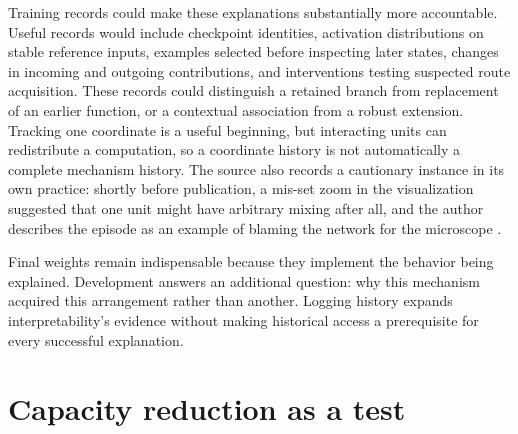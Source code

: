 \documentclass[11pt]{article}
\begin{document}
Training records could make these explanations substantially more accountable. Useful records would include checkpoint identities, activation distributions on stable reference inputs, examples selected before inspecting later states, changes in incoming and outgoing contributions, and interventions testing suspected route acquisition. These records could distinguish a retained branch from replacement of an earlier function, or a contextual association from a robust extension. Tracking one coordinate is a useful beginning, but interacting units can redistribute a computation, so a coordinate history is not automatically a complete mechanism history. The source also records a cautionary instance in its own practice: shortly before publication, a mis-set zoom in the visualization suggested that one unit might have arbitrary mixing after all, and the author describes the episode as an example of blaming the network for the microscope \cite[\emph{Watching Neurons Develop}]{cammarata}.

Final weights remain indispensable because they implement the behavior being explained. Development answers an additional question: why this mechanism acquired this arrangement rather than another. Logging history expands interpretability's evidence without making historical access a prerequisite for every successful explanation.

\section{Capacity reduction as a test}
\end{document}

